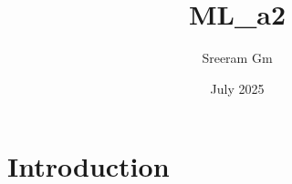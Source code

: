 \documentclass{article}
\title{ML_a2}
\author{Sreeram Gm}
\date{July 2025}
\begin{document}
\maketitle

\section{Introduction}
\end{document}
